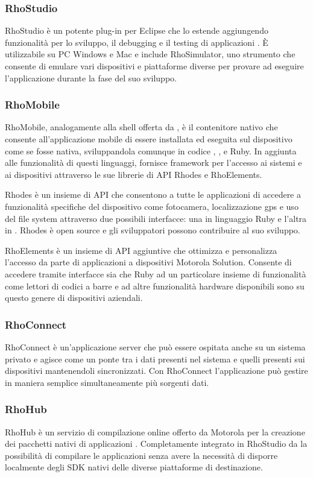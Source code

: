 			\subsubsection{RhoStudio}
				RhoStudio è un potente plug-in per Eclipse che lo estende aggiungendo
				funzionalità per lo sviluppo, il debugging e il testing di
				applicazioni \rhom{}. È utilizzabile su PC Windows e Mac e
				include RhoSimulator, uno strumento che consente di emulare
				vari dispositivi e piattaforme diverse per provare ad eseguire
				l'applicazione durante la fase del suo sviluppo.
			\subsubsection{RhoMobile}
				RhoMobile, analogamente alla shell offerta da \pg{}, è il contenitore
				nativo che consente all'applicazione mobile di essere installata ed
				eseguita sul dispositivo come se fosse nativa, sviluppandola
				comunque in codice \html{}, \css{}, \js{} e Ruby. In aggiunta
				alle funzionalità di questi linguaggi, \rhom{} fornisce
				framework per l'accesso ai sistemi e ai dispositivi attraverso
				le sue librerie di API Rhodes e RhoElements.
				
				Rhodes è un insieme di API che consentono a tutte le applicazioni
				\rhom{} di accedere a funzionalità specifiche del dispositivo
				come fotocamera, localizzazione gps e uso del file system attraverso
				due possibili interfacce: una in linguaggio Ruby e l'altra in
				\js{}. Rhodes è open source e gli sviluppatori possono
				contribuire al suo sviluppo.
				
				RhoElements è un insieme di API aggiuntive che ottimizza e personalizza
				l'accesso da parte di applicazioni \rhom{} a dispositivi
				Motorola Solution. Consente di accedere tramite interfacce
				sia \js{} che Ruby ad un particolare insieme di funzionalità
				come lettori di codici a barre e ad altre funzionalità
				hardware disponibili sono su questo genere di dispositivi
				aziendali.
			\subsubsection{RhoConnect}
				RhoConnect è un'applicazione server che può essere ospitata anche
				su un sistema privato e agisce come un ponte tra i dati presenti
				nel sistema e quelli presenti sui dispositivi mantenendoli sincronizzati.
				Con RhoConnect l'applicazione può gestire in maniera semplice
				simultaneamente più	sorgenti dati.
			\subsubsection{RhoHub}
				RhoHub è un servizio di compilazione online offerto da Motorola
				per la creazione dei pacchetti nativi di applicazioni \rhom{}.
				Completamente integrato in RhoStudio da la possibilità di
				compilare le applicazioni senza	avere la necessità di disporre
				localmente degli SDK nativi delle diverse piattaforme di
				destinazione.
